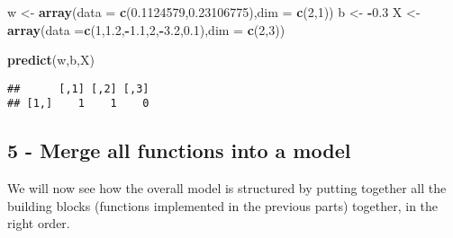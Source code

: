 \documentclass[]{article}
\newenvironment{Shaded}{\begin{snugshade}}{\end{snugshade}}
\newcommand{\KeywordTok}[1]{\textcolor[rgb]{0.13,0.29,0.53}{\textbf{#1}}}
\newcommand{\DataTypeTok}[1]{\textcolor[rgb]{0.13,0.29,0.53}{#1}}
\newcommand{\DecValTok}[1]{\textcolor[rgb]{0.00,0.00,0.81}{#1}}
\newcommand{\FloatTok}[1]{\textcolor[rgb]{0.00,0.00,0.81}{#1}}
\newcommand{\StringTok}[1]{\textcolor[rgb]{0.31,0.60,0.02}{#1}}
\newcommand{\OperatorTok}[1]{\textcolor[rgb]{0.81,0.36,0.00}{\textbf{#1}}}
\newcommand{\NormalTok}[1]{#1}
\begin{document}
\begin{Shaded}
\begin{Highlighting}[]
\NormalTok{w <-}\StringTok{ }\KeywordTok{array}\NormalTok{(}\DataTypeTok{data =} \KeywordTok{c}\NormalTok{(}\FloatTok{0.1124579}\NormalTok{,}\FloatTok{0.23106775}\NormalTok{),}\DataTypeTok{dim =} \KeywordTok{c}\NormalTok{(}\DecValTok{2}\NormalTok{,}\DecValTok{1}\NormalTok{))}
\NormalTok{b <-}\StringTok{ }\OperatorTok{-}\FloatTok{0.3}
\NormalTok{X <-}\StringTok{ }\KeywordTok{array}\NormalTok{(}\DataTypeTok{data =}\KeywordTok{c}\NormalTok{(}\DecValTok{1}\NormalTok{,}\FloatTok{1.2}\NormalTok{,}\OperatorTok{-}\FloatTok{1.1}\NormalTok{,}\DecValTok{2}\NormalTok{,}\OperatorTok{-}\FloatTok{3.2}\NormalTok{,}\FloatTok{0.1}\NormalTok{),}\DataTypeTok{dim =} \KeywordTok{c}\NormalTok{(}\DecValTok{2}\NormalTok{,}\DecValTok{3}\NormalTok{))}

\KeywordTok{predict}\NormalTok{(w,b,X)}
\end{Highlighting}
\end{Shaded}

\begin{verbatim}
##      [,1] [,2] [,3]
## [1,]    1    1    0
\end{verbatim}

\subsection{5 - Merge all functions into a
model}\label{merge-all-functions-into-a-model}

We will now see how the overall model is structured by putting together
all the building blocks (functions implemented in the previous parts)
together, in the right order.
\end{document}
